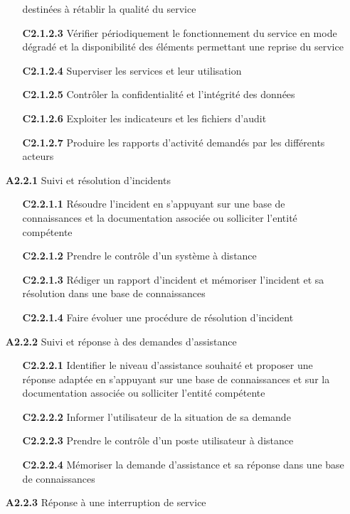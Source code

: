 \documentclass[12pt,a4paper,oneside,titlepage,final]{article}
\begin{document}
\begin{enumerate}
\begin{itemize}
    destinées à rétablir la qualité du service
    \item [\textbf{C2.1.2.3}] Vérifier périodiquement le
    fonctionnement du service en mode dégradé et la disponibilité des
    éléments permettant une reprise du service
    \item [\textbf{C2.1.2.4}] Superviser les services et leur
    utilisation
    \item [\textbf{C2.1.2.5}] Contrôler la confidentialité et
    l'intégrité des données
    \item [\textbf{C2.1.2.6}] Exploiter les indicateurs et les
    fichiers d'audit
    \item [\textbf{C2.1.2.7}] Produire les rapports d'activité
    demandés par les différents acteurs
  \end{itemize}
  \item [\textbf{A2.2.1}] Suivi et résolution d'incidents
  \begin{itemize}
    \item [\textbf{C2.2.1.1}] Résoudre l'incident en s'appuyant
    sur une base de connaissances et la documentation associée ou
    solliciter l'entité compétente
    \item [\textbf{C2.2.1.2}] Prendre le contrôle d'un système à
    distance
    \item [\textbf{C2.2.1.3}] Rédiger un rapport d'incident et
    mémoriser l'incident et sa résolution dans une base de
    connaissances
    \item [\textbf{C2.2.1.4}] Faire évoluer une procédure de
    résolution d'incident
  \end{itemize}
  \item [\textbf{A2.2.2}] Suivi et réponse à des demandes d'assistance
  \begin{itemize}
    \item [\textbf{C2.2.2.1}] Identifier le niveau d'assistance
    souhaité et proposer une réponse adaptée en s'appuyant sur une
    base de connaissances et sur la documentation associée ou
    solliciter l'entité compétente
    \item [\textbf{C2.2.2.2}] Informer l'utilisateur de la situation
    de sa demande
    \item [\textbf{C2.2.2.3}] Prendre le contrôle d'un poste
    utilisateur à distance
    \item [\textbf{C2.2.2.4}] Mémoriser la demande d'assistance et sa
    réponse dans une base de connaissances
  \end{itemize}
  \item [\textbf{A2.2.3}] Réponse à une interruption de service

\end{enumerate}
\end{document}
